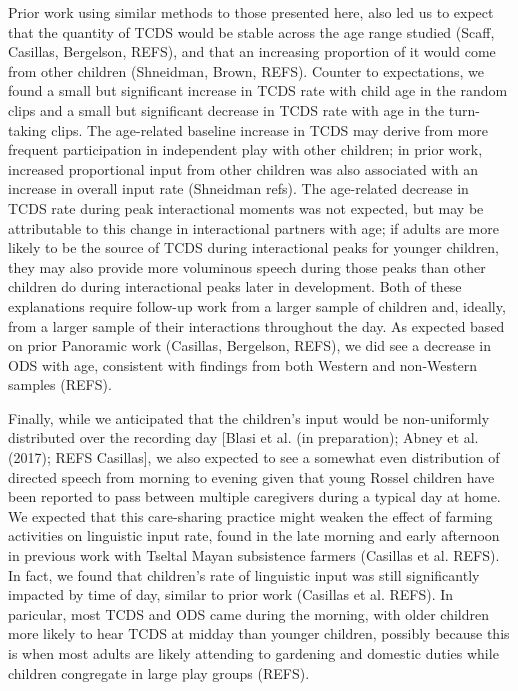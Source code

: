 \documentclass[,man,floatsintext]{apa6}
\begin{document}
Prior work using similar methods to those presented here, also led us to
expect that the quantity of TCDS would be stable across the age range
studied (Scaff, Casillas, Bergelson, REFS), and that an increasing
proportion of it would come from other children (Shneidman, Brown,
REFS). Counter to expectations, we found a small but significant
increase in TCDS rate with child age in the random clips and a small but
significant decrease in TCDS rate with age in the turn-taking clips. The
age-related baseline increase in TCDS may derive from more frequent
participation in independent play with other children; in prior work,
increased proportional input from other children was also associated
with an increase in overall input rate (Shneidman refs). The age-related
decrease in TCDS rate during peak interactional moments was not
expected, but may be attributable to this change in interactional
partners with age; if adults are more likely to be the source of TCDS
during interactional peaks for younger children, they may also provide
more voluminous speech during those peaks than other children do during
interactional peaks later in development. Both of these explanations
require follow-up work from a larger sample of children and, ideally,
from a larger sample of their interactions throughout the day. As
expected based on prior Panoramic work (Casillas, Bergelson, REFS), we
did see a decrease in ODS with age, consistent with findings from both
Western and non-Western samples (REFS).

Finally, while we anticipated that the children's input would be
non-uniformly distributed over the recording day {[}Blasi et al. (in
preparation); Abney et al. (2017); REFS Casillas{]}, we also expected to
see a somewhat even distribution of directed speech from morning to
evening given that young Rossel children have been reported to pass
between multiple caregivers during a typical day at home. We expected
that this care-sharing practice might weaken the effect of farming
activities on linguistic input rate, found in the late morning and early
afternoon in previous work with Tseltal Mayan subsistence farmers
(Casillas et al. REFS). In fact, we found that children's rate of
linguistic input was still significantly impacted by time of day,
similar to prior work (Casillas et al. REFS). In paricular, most TCDS
and ODS came during the morning, with older children more likely to hear
TCDS at midday than younger children, possibly because this is when most
adults are likely attending to gardening and domestic duties while
children congregate in large play groups (REFS).
\end{document}
